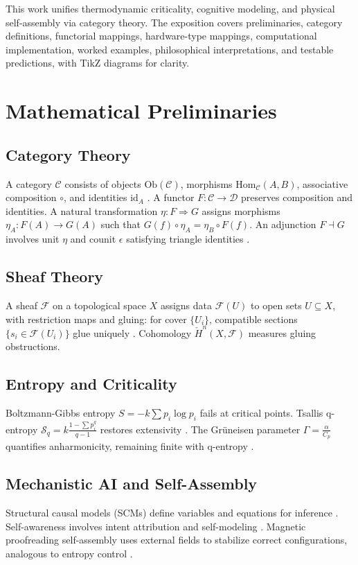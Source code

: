 \documentclass{article}
\theoremstyle{plain}
\theoremstyle{definition}
\begin{document}
This work unifies thermodynamic criticality, cognitive modeling, and physical self-assembly via category theory. The exposition covers preliminaries, category definitions, functorial mappings, hardware-type mappings, computational implementation, worked examples, philosophical interpretations, and testable predictions, with TikZ diagrams for clarity.

\section{Mathematical Preliminaries}

\subsection{Category Theory}
A category $\mathcal{C}$ consists of objects $\text{Ob}(\mathcal{C})$, morphisms $\text{Hom}_{\mathcal{C}}(A, B)$, associative composition $\circ$, and identities $\text{id}_A$ \cite{Awodey2010,Lawvere2009}. A functor $F: \mathcal{C} \to \mathcal{D}$ preserves composition and identities. A natural transformation $\eta: F \Rightarrow G$ assigns morphisms $\eta_A: F(A) \to G(A)$ such that $G(f) \circ \eta_A = \eta_B \circ F(f)$. An adjunction $F \dashv G$ involves unit $\eta$ and counit $\epsilon$ satisfying triangle identities \cite{Spivak2014}.

\subsection{Sheaf Theory}
A sheaf $\mathcal{F}$ on a topological space $X$ assigns data $\mathcal{F}(U)$ to open sets $U \subseteq X$, with restriction maps and gluing: for cover $\{U_i\}$, compatible sections $\{s_i \in \mathcal{F}(U_i)\}$ glue uniquely \cite{MacLane1992,Bredon1997}. Cohomology $\check{H}^n(X, \mathcal{F})$ measures gluing obstructions.

\subsection{Entropy and Criticality}
Boltzmann-Gibbs entropy $S = -k \sum p_i \log p_i$ fails at critical points. Tsallis q-entropy $\mathcal{S}_q = k \frac{1 - \sum p_i^q}{q-1}$ restores extensivity \cite{Tsallis1988}. The Gr\"uneisen parameter $\Gamma = \frac{\alpha}{C_p}$ quantifies anharmonicity, remaining finite with q-entropy \cite{Soares2023prb,Soares2024}.

\subsection{Mechanistic AI and Self-Assembly}
Structural causal models (SCMs) define variables and equations for inference \cite{Pearl2009}. Self-awareness involves intent attribution and self-modeling \cite{Bennett2025,Goguen1992}. Magnetic proofreading self-assembly uses external fields to stabilize correct configurations, analogous to entropy control \cite{Liang2025}.
\end{document}
